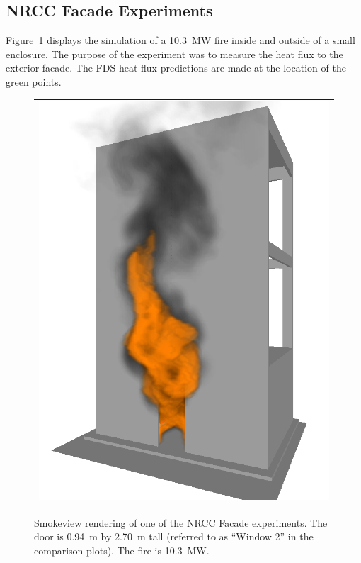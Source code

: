 \subsection{NRCC Facade Experiments}

Figure~\ref{NRCC_Facade_Image} displays the simulation of a 10.3~MW fire inside and outside of a small enclosure. The purpose of the experiment was to measure the heat flux to the exterior facade. The FDS heat flux predictions are made at the location of the green points.

\begin{figure}[h!]
\begin{center}
\begin{tabular}{c}
\includegraphics[width=5.0in]{FIGURES/NRCC_Facade/NRCC_Facade_Win_2_10_MW_0467}
\end{tabular}
\end{center}
\caption[Smokeview rendering of NRCC Facade experiment]
{Smokeview rendering of one of the NRCC Facade experiments. The door is
0.94~m by 2.70~m tall (referred to as ``Window 2'' in the comparison plots). The
fire is 10.3~MW.}
\label{NRCC_Facade_Image}
\end{figure}

